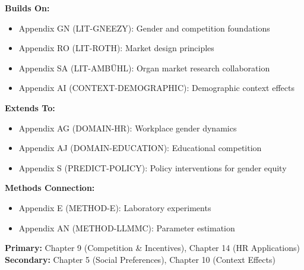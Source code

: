 \begin{tcolorbox}[colback=blue!5!white,colframe=blue!75!black,title=Cross-Reference Map]
\textbf{Builds On:}
\begin{itemize}
    \item Appendix GN (LIT-GNEEZY): Gender and competition foundations
    \item Appendix RO (LIT-ROTH): Market design principles
    \item Appendix SA (LIT-AMBÜHL): Organ market research collaboration
    \item Appendix AI (CONTEXT-DEMOGRAPHIC): Demographic context effects
\end{itemize}

\textbf{Extends To:}
\begin{itemize}
    \item Appendix AG (DOMAIN-HR): Workplace gender dynamics
    \item Appendix AJ (DOMAIN-EDUCATION): Educational competition
    \item Appendix S (PREDICT-POLICY): Policy interventions for gender equity
\end{itemize}

\textbf{Methods Connection:}
\begin{itemize}
    \item Appendix E (METHOD-E): Laboratory experiments
    \item Appendix AN (METHOD-LLMMC): Parameter estimation
\end{itemize}
\end{tcolorbox}

\begin{tcolorbox}[colback=green!5!white,colframe=green!75!black,title=Chapter Linkage]
\textbf{Primary:} Chapter 9 (Competition \& Incentives), Chapter 14 (HR Applications) \\
\textbf{Secondary:} Chapter 5 (Social Preferences), Chapter 10 (Context Effects)
\end{tcolorbox}

